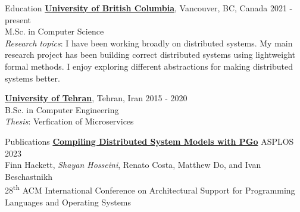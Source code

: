 \documentclass{resume} %
\begin{document}
	

\begin{rSection}{Education}
	{\bf \href{https://www.ubc.ca/}{University of British Columbia}}, Vancouver, BC, Canada
        \hfill 2021 - present
	\\M.Sc. in Computer Science
  \\\textit{Research topics}: I have been working broadly on distributed
  systems. My main research project has been building correct distributed
  systems using lightweight formal methods. I enjoy exploring different
  abstractions for making distributed systems better.

	{\bf \href{http://ut.ac.ir/en}{University of Tehran}}, Tehran, Iran \hfill 2015 - 2020 
	\\B.Sc. in Computer Engineering
  \\\textit{Thesis}: Verfication of Microservices
\end{rSection}


\begin{rSection}{Publications}
  {\bf \href{https://dl.acm.org/doi/10.1145/3575693.3575695}{Compiling Distributed System Models with PGo}} \hfill ASPLOS 2023
  \\ Finn Hackett, \textit{Shayan Hosseini}, Renato Costa, Matthew Do, and Ivan
  Beschastnikh
  \\ 28\textsuperscript{th} ACM International Conference on Architectural
  Support for Programming Languages and Operating Systems
\end{rSection}

\end{document}

